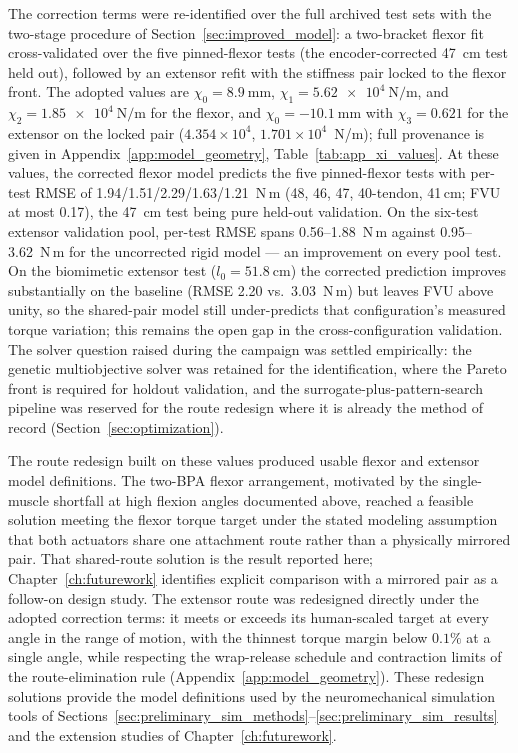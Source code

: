 The correction terms were re-identified over the full archived test sets with the two-stage procedure of Section~\ref{sec:improved_model}: a two-bracket flexor fit cross-validated over the five pinned-flexor tests (the encoder-corrected \qty{47}{\cm} test held out), followed by an extensor refit with the stiffness pair locked to the flexor front. The adopted values are $\chi_{0} = \qty{+8.9}{\mm}$, $\chi_{1} = \qty{5.62e4}{\N\per\m}$, and $\chi_{2} = \qty{1.85e4}{\N\per\m}$ for the flexor, and $\chi_{0} = \qty{-10.1}{\mm}$ with $\chi_{3} = 0.621$ for the extensor on the locked pair ($4.354\times10^{4}$, $1.701\times10^{4}$~N/m); full provenance is given in Appendix~\ref{app:model_geometry}, Table~\ref{tab:app_xi_values}. At these values, the corrected flexor model predicts the five pinned-flexor tests with per-test RMSE of 1.94/1.51/2.29/1.63/1.21~N{\,}m (48, 46, 47, 40-tendon, 41\,cm; FVU at most 0.17), the \qty{47}{\cm} test being pure held-out validation. On the six-test extensor validation pool, per-test RMSE spans 0.56--1.88~N{\,}m against 0.95--3.62~N{\,}m for the uncorrected rigid model --- an improvement on every pool test. On the biomimetic extensor test ($l_{0} = \qty{51.8}{\cm}$) the corrected prediction improves substantially on the baseline (RMSE 2.20 vs.\ 3.03~N{\,}m) but leaves FVU above unity, so the shared-pair model still under-predicts that configuration's measured torque variation; this remains the open gap in the cross-configuration validation. The solver question raised during the campaign was settled empirically: the genetic multiobjective solver was retained for the identification, where the Pareto front is required for holdout validation, and the surrogate-plus-pattern-search pipeline was reserved for the route redesign where it is already the method of record (Section~\ref{sec:optimization}).

The route redesign built on these values produced usable flexor and extensor model definitions. The two-BPA flexor arrangement, motivated by the single-muscle shortfall at high flexion angles documented above, reached a feasible solution meeting the flexor torque target under the stated modeling assumption that both actuators share one attachment route rather than a physically mirrored pair. That shared-route solution is the result reported here; Chapter~\ref{ch:futurework} identifies explicit comparison with a mirrored pair as a follow-on design study. The extensor route was redesigned directly under the adopted correction terms: it meets or exceeds its human-scaled target at every angle in the range of motion, with the thinnest torque margin below $0.1\%$ at a single angle, while respecting the wrap-release schedule and contraction limits of the route-elimination rule (Appendix~\ref{app:model_geometry}). These redesign solutions provide the model definitions used by the neuromechanical simulation tools of Sections~\ref{sec:preliminary_sim_methods}--\ref{sec:preliminary_sim_results} and the extension studies of Chapter~\ref{ch:futurework}.

